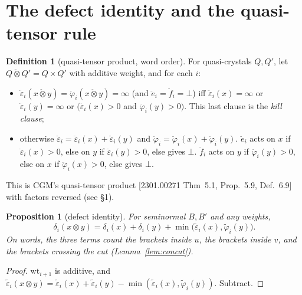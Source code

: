 \documentclass[11pt]{amsart}
\newtheorem{proposition}[theorem]{Proposition}
\theoremstyle{definition}
\newtheorem{definition}[theorem]{Definition}
\theoremstyle{remark}
\newcommand{\ee}{\ddot e}
\newcommand{\ff}{\ddot f}
\newcommand{\eps}{\ddot\varepsilon}
\newcommand{\vphi}{\ddot\varphi}
\newcommand{\teps}{\tilde\varepsilon}
\newcommand{\tphi}{\tilde\varphi}
\newcommand{\qt}{\mathbin{\ddot\otimes}}
\newcommand{\wt}{\mathrm{wt}}
\begin{document}
\section{The defect identity and the quasi-tensor rule}

\begin{definition}[quasi-tensor product, word order]\label{def:qt}
For quasi-crystals $Q,Q'$, let $Q\qt Q'=Q\times Q'$ with additive weight, and for each $i$:
\begin{itemize}
\item $\eps_i(x\qt y)=\vphi_i(x\qt y)=\infty$ (and $\ee_i=\ff_i=\bot$) iff $\eps_i(x)=\infty$ or $\eps_i(y)=\infty$ or $\big(\eps_i(x)>0$ and $\vphi_i(y)>0\big)$. This last clause is the \emph{kill clause};
\item otherwise $\eps_i=\eps_i(x)+\eps_i(y)$ and $\vphi_i=\vphi_i(x)+\vphi_i(y)$. $\ee_i$ acts on $x$ if $\eps_i(x)>0$, else on $y$ if $\eps_i(y)>0$, else gives $\bot$. $\ff_i$ acts on $y$ if $\vphi_i(y)>0$, else on $x$ if $\vphi_i(x)>0$, else gives $\bot$.
\end{itemize}
This is CGM's quasi-tensor product [2301.00271 Thm~5.1, Prop.~5.9, Def.~6.9] with factors reversed (see \S1).
\end{definition}

\begin{proposition}[defect identity]\label{prop:defect}
For seminormal $B,B'$ and any weights,
\[\boxed{\ \delta_i(x\otimes y)=\delta_i(x)+\delta_i(y)+\min\big(\teps_i(x),\tphi_i(y)\big).\ }\]
On words, the three terms count the brackets inside $u$, the brackets inside $v$, and the brackets crossing the cut (Lemma~\ref{lem:concat}).
\end{proposition}
\begin{proof}
$\wt_{i+1}$ is additive, and $\teps_i(x\otimes y)=\teps_i(x)+\teps_i(y)-\min(\teps_i(x),\tphi_i(y))$. Subtract.
\end{proof}
\end{document}
